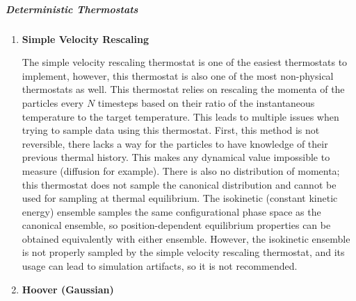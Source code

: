 \documentclass[9pt,bestpractices]{livecoms}
\begin{document}
\subparagraph{Deterministic Thermostats}
\begin{enumerate}[listparindent=\parindent]
    \item \textbf{Simple Velocity Rescaling}

        The simple velocity rescaling thermostat is one of the easiest thermostats to implement, however, this thermostat is also one of the most non-physical thermostats as well.
        This thermostat relies on rescaling the momenta of the particles every $N$ timesteps based on their ratio of the instantaneous temperature to the target temperature\cite{thermostatAlgorithms2005}.
        This leads to multiple issues when trying to sample data using this thermostat.
        First, this method is not reversible, there lacks a way for the particles to have knowledge of their previous thermal history.
        This makes any dynamical value impossible to measure (diffusion for example).
        There is also no distribution of momenta; this thermostat does not sample the canonical distribution and cannot be used for sampling at thermal equilibrium.
        The isokinetic (constant kinetic energy) ensemble samples the same configurational phase space as the canonical ensemble, so position-dependent equilibrium properties can be obtained equivalently with either ensemble\cite{Minary:2003:JChemPhys:Algorithms}.
        However, the isokinetic ensemble is not properly sampled by the simple velocity rescaling thermostat, and its usage can lead to simulation artifacts, so it is not recommended\cite{Braun:2018:arXiv:Anomalous}.

    \item \textbf{Hoover (Gaussian)}
        

\end{enumerate}
\end{document}

